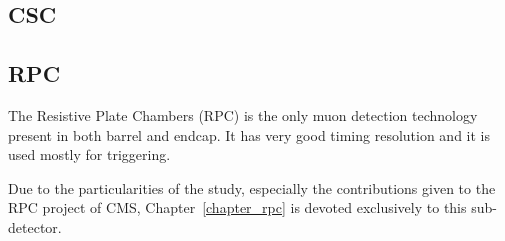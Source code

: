 
\subsection{CSC}

\subsection{RPC}

The Resistive Plate Chambers (RPC) is the only muon detection technology present in both barrel and endcap. It has very good timing resolution and it is used mostly for triggering.

Due to the particularities of the study, especially the contributions given to the RPC project of CMS, Chapter~\ref{chapter_rpc} is devoted exclusively to this sub-detector.

